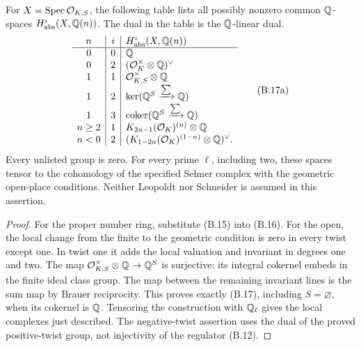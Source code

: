\begin{corollary}
\label{cor:B-Hf-all-degrees}
For \(X=\operatorname{Spec}\mathcal O_{K,S}\), the following table lists all
possibly nonzero common \(\mathbb Q\)-spaces \(H^i_{\rm abs}(X,\mathbb Q(n))\).
The dual in the table is the \(\mathbb Q\)-linear dual.
\[
\begin{array}{c|c|l}
 n&i&H^i_{\rm abs}(X,\mathbb Q(n))\\ \hline
 0&0&\mathbb Q\\
 0&2&(\mathcal O_K^\times\otimes\mathbb Q)^\vee\\
 1&1&\mathcal O_{K,S}^\times\otimes\mathbb Q\\
 1&2&\ker(\mathbb Q^S\xrightarrow{\sum}\mathbb Q)\\
 1&3&\operatorname{coker}(\mathbb Q^S\xrightarrow{\sum}\mathbb Q)\\
 n\ge2&1&K_{2n-1}(\mathcal O_K)^{(n)}\otimes\mathbb Q\\
 n<0&2&(K_{1-2n}(\mathcal O_K)^{(1-n)}\otimes\mathbb Q)^\vee .
\end{array}
\tag{B.17a}
\]
Every unlisted group is zero.  For every prime \(\ell\), including
two, these spaces tensor to the cohomology of the specified Selmer
complex with the geometric open-place conditions.  Neither Leopoldt
nor Schneider is assumed in this assertion.
\end{corollary}
\begin{proof}
For the proper number ring, substitute (B.15) into (B.16).  For the
open, the local change from the finite to the geometric condition
is zero in every twist except one.  In twist one it adds the local
valuation and invariant in degrees one and two.  The map
\(\mathcal O_{K,S}^\times\otimes\mathbb Q\to\mathbb Q^S\) is surjective:
its integral cokernel embeds in the finite ideal class group.
The map between the remaining invariant lines is the sum map by
Brauer reciprocity.  This proves exactly (B.17), including
\(S=\varnothing\), when its cokernel is \(\mathbb Q\).  Tensoring the
construction with \(\mathbb Q_\ell\) gives the local complexes just
described.  The negative-twist assertion uses the dual of the proved
positive-twist group, not injectivity of the regulator (B.12).
\end{proof}

